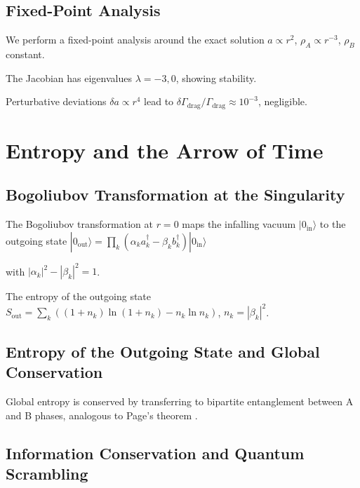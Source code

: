 \documentclass[10pt,twocolumn]{article}
\theoremstyle{definition}
\newcommand{\rhoA}{\rho_{A}}
\newcommand{\rhoB}{\rho_{B}}
\newcommand{\Gammadrag}{\Gamma_{\mathrm{drag}}}
\begin{document}
\subsection{Fixed-Point Analysis}

We perform a fixed-point analysis around the exact solution \( a \propto r^{2} \), \( \rhoA \propto r^{-3} \), \( \rhoB \) constant.

The Jacobian has eigenvalues \( \lambda = -3, 0 \), showing stability.

Perturbative deviations \( \delta a \propto r^{4} \) lead to \( \delta \Gammadrag / \Gammadrag \approx 10^{-3} \), negligible.

\section{Entropy and the Arrow of Time}
\label{sec:entropy}

\subsection{Bogoliubov Transformation at the Singularity}

The Bogoliubov transformation at \( r=0 \) maps the infalling vacuum \( |0_{\mathrm{in}}\rangle \) to the outgoing state \( |0_{\mathrm{out}}\rangle = \prod_{k} (\alpha_{k} a_{k}^{\dagger} - \beta_{k} b_{k}^{\dagger}) |0_{\mathrm{in}}\rangle \)

with \( |\alpha_{k}|^{2} - |\beta_{k}|^{2} = 1 \).

The entropy of the outgoing state \( S_{\mathrm{out}} = \sum_{k} ( (1 + n_{k}) \ln(1 + n_{k}) - n_{k} \ln n_{k} ) \), \( n_{k} = |\beta_{k}|^{2} \).

\subsection{Entropy of the Outgoing State and Global Conservation}

Global entropy is conserved by transferring to bipartite entanglement between A and B phases, analogous to Page's theorem \citep{Page1993}.

\subsection{Information Conservation and Quantum Scrambling}
\end{document}
